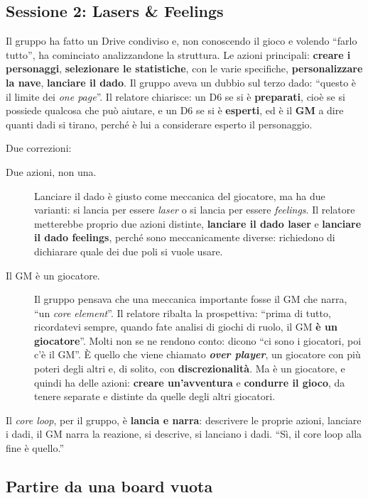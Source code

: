 \subsection{Sessione 2: Lasers \& Feelings}

Il gruppo ha fatto un Drive condiviso e, non conoscendo il gioco e volendo
``farlo tutto'', ha cominciato analizzandone la struttura. Le azioni principali:
\textbf{creare i personaggi}, \textbf{selezionare le statistiche}, con le varie
specifiche, \textbf{personalizzare la nave}, \textbf{lanciare il dado}. Il gruppo
aveva un dubbio sul terzo dado: ``questo è il limite dei \emph{one page}''. Il
relatore chiarisce: un D6 se si è \textbf{preparati}, cioè se si possiede qualcosa
che può aiutare, e un D6 se si è \textbf{esperti}, ed è il \textbf{GM} a dire
quanti dadi si tirano, perché è lui a considerare esperto il personaggio.

Due correzioni:
\begin{description}
  \item[Due azioni, non una.] Lanciare il dado è giusto come meccanica del
        giocatore, ma ha due varianti: si lancia per essere \emph{laser} o si
        lancia per essere \emph{feelings}. Il relatore metterebbe proprio due
        azioni distinte, \textbf{lanciare il dado laser} e \textbf{lanciare il
        dado feelings}, perché sono meccanicamente diverse: richiedono di
        dichiarare quale dei due poli si vuole usare.
  \item[Il GM è un giocatore.] Il gruppo pensava che una meccanica importante
        fosse il GM che narra, ``un \emph{core element}''. Il relatore ribalta la
        prospettiva: ``prima di tutto, ricordatevi sempre, quando fate analisi
        di giochi di ruolo, il GM \textbf{è un giocatore}''. Molti non se ne
        rendono conto: dicono ``ci sono i giocatori, poi c'è il GM''. È quello che
        viene chiamato \textbf{\emph{over player}}, un giocatore con più poteri
        degli altri e, di solito, con \textbf{discrezionalità}. Ma è un giocatore,
        e quindi ha delle azioni: \textbf{creare un'avventura} e \textbf{condurre
        il gioco}, da tenere separate e distinte da quelle degli altri
        giocatori.
\end{description}
Il \emph{core loop}, per il gruppo, è \textbf{lancia e narra}: descrivere le
proprie azioni, lanciare i dadi, il GM narra la reazione, si descrive, si lanciano
i dadi. ``Sì, il core loop alla fine è quello.''

\subsection{Partire da una board vuota}

